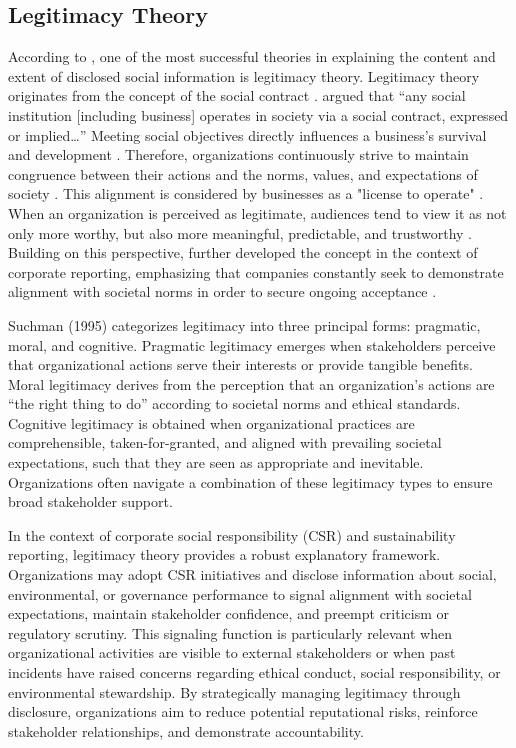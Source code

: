 \subsection{Legitimacy Theory}

According to \textcite{Grey1995}, one of the most successful theories in explaining the content and extent of 
disclosed social information is legitimacy theory. Legitimacy theory originates from the concept of the social 
contract \parencite{Patten1991}. \textcite{Schoker1974} argued that “any social institution [including business] 
operates in society via a social contract, expressed or implied…” Meeting social objectives directly influences 
a business's survival and development \parencite{Schoker1974}. Therefore, organizations continuously strive to 
maintain congruence between their actions and the norms, values, and expectations of society \parencite{Suchman1995}. 
This alignment is considered by businesses as a "license to operate" \parencite{Demuijnck2016}. When an organization 
is perceived as legitimate, audiences tend to view it as not only more worthy, but also more meaningful, predictable, 
and trustworthy \parencite{Suchman1995}. Building on this perspective, \textcite{Deegan2002} further developed the 
concept in the context of corporate reporting, emphasizing that companies constantly seek to demonstrate alignment 
with societal norms in order to secure ongoing acceptance \parencite{Deegan2002}.

Suchman (1995) categorizes legitimacy into three principal forms: pragmatic, moral, and cognitive. 
Pragmatic legitimacy emerges when stakeholders perceive that organizational actions serve their interests 
or provide tangible benefits. Moral legitimacy derives from the perception that an organization’s actions 
are “the right thing to do” according to societal norms and ethical standards. Cognitive legitimacy is obtained 
when organizational practices are comprehensible, taken-for-granted, and aligned with prevailing societal 
expectations, such that they are seen as appropriate and inevitable. Organizations often navigate a combination 
of these legitimacy types to ensure broad stakeholder support.

In the context of corporate social responsibility (CSR) and sustainability reporting, legitimacy theory provides 
a robust explanatory framework. Organizations may adopt CSR initiatives and disclose information about social, 
environmental, or governance performance to signal alignment with societal expectations, maintain stakeholder 
confidence, and preempt criticism or regulatory scrutiny. This signaling function is particularly relevant 
when organizational activities are visible to external stakeholders or when past incidents have raised concerns 
regarding ethical conduct, social responsibility, or environmental stewardship. By strategically managing legitimacy 
through disclosure, organizations aim to reduce potential reputational risks, reinforce stakeholder relationships, 
and demonstrate accountability.

